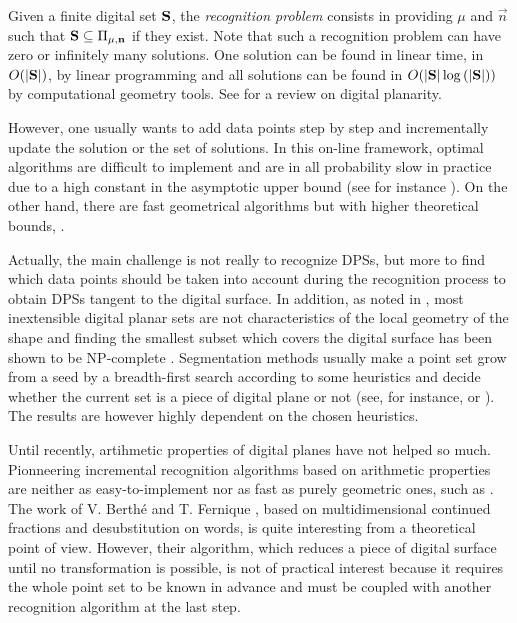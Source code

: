 Given a finite digital set $\mathbf{S}$, the \emph{recognition problem} consists in providing
$\mu$ and $\vec{n}$ such that $\mathbf{S} \subseteq \Pi_{\mu,\mathbf{n}}$ if they exist.
Note that such a recognition problem can have zero or infinitely many solutions.
One solution can be found in linear time, \ie in $O(|\mathbf{S}|)$, by linear programming
and all solutions can be found in $O(|\mathbf{S}|\log{(|\ensuremath{\mathbf{S}}|)})$ by computational geometry tools.
See \cite{Brimkov2007} for a review on digital planarity.

However, one usually wants to add data points step by step and incrementally update the solution
or the set of solutions. In this on-line framework, optimal algorithms are difficult
to implement and are in all probability slow in practice due to a high constant in the asymptotic
upper bound (see for instance \cite{Buzer2003}).
On the other hand, there are fast geometrical algorithms but with higher theoretical bounds,
\eg \cite{Gerard2005, Charrier2008, Veelaert2012}.

Actually, the main challenge is not really to recognize DPSs, but more to find which data points
should be taken into account during the recognition process to obtain DPSs tangent to the digital
surface. In addition, as noted in \cite{Charrier2011}, most inextensible digital planar sets are not
characteristics of the local geometry of the shape and finding the smallest subset which covers
the digital surface has been shown to be NP-complete \cite{Sivignon2009}.
Segmentation methods usually make a point set grow from a seed by a breadth-first search according
to some heuristics and decide whether the current set is a piece of digital plane or not
(see, for instance, \cite{Klette2001} or \cite{Sivignon2004}). 
The results are however highly dependent on the chosen heuristics.   

Until recently, artihmetic properties of digital planes have not helped so much.
Pionneering incremental recognition algorithms based on arithmetic properties
\cite{Debled1994,Mesmoudi2002} are neither as easy-to-implement nor as fast as
purely geometric ones, such as \cite{Gerard2005}.  
The work of V. Berth\'{e} and T. Fernique \cite{Fernique2009,Berthe2011}, 
based on multidimensional continued fractions and desubstitution on words,
is quite interesting from a theoretical point of view. However, their algorithm,
which reduces a piece of digital surface until no transformation is possible,
is not of practical interest because it requires the whole point set to be known
in advance and must be coupled with another recognition algorithm at the last step.  

